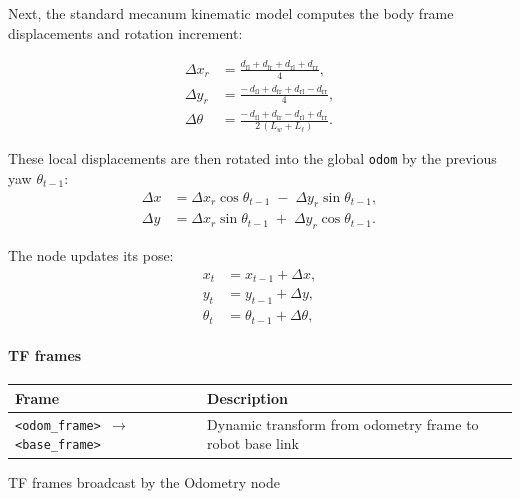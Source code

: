 Next, the standard mecanum kinematic model computes the body frame displacements and rotation increment:

\begin{equation}
  \begin{aligned}
    \Delta x_r
     & = \frac{d_{\mathrm{fl}} + d_{\mathrm{fr}} + d_{\mathrm{rl}} + d_{\mathrm{rr}}}{4},    \\
    \Delta y_r
     & = \frac{-\,d_{\mathrm{fl}} + d_{\mathrm{fr}} + d_{\mathrm{rl}} - d_{\mathrm{rr}}}{4}, \\
    \Delta\theta
     & = \frac{-\,d_{\mathrm{fl}} + d_{\mathrm{fr}} - d_{\mathrm{rl}} + d_{\mathrm{rr}}}
    {2\,(L_w + L_\ell)}.
  \end{aligned}
\end{equation}

These local displacements are then rotated into the global \texttt{odom} by the previous yaw $\theta_{t-1}$:
\begin{equation}
  \begin{aligned}
    \Delta x & = \Delta x_r\cos\theta_{t-1} \;-\; \Delta y_r\sin\theta_{t-1}, \\
    \Delta y & = \Delta x_r\sin\theta_{t-1} \;+\; \Delta y_r\cos\theta_{t-1}.
  \end{aligned}
\end{equation}

The node updates its pose:
\begin{equation}
  \begin{aligned}
    x_t      & = x_{t-1} + \Delta x,          \\
    y_t      & = y_{t-1} + \Delta y,          \\
    \theta_t & = \theta_{t-1} + \Delta\theta,
  \end{aligned}
\end{equation}

\paragraph*{TF frames}
\begin{table}[H]
  \centering
  \begin{tabularx}{\textwidth}{ll}
    \toprule
    \textbf{Frame} & \textbf{Description}                                     \\
    \midrule
    \texttt{<odom\_frame> $\rightarrow$ <base\_frame>}
                   & Dynamic transform from odometry frame to robot base link \\
    \bottomrule
  \end{tabularx}
  {TF frames broadcast by the Odometry node}
  \label{tab:odo-tf-frames}
\end{table}

